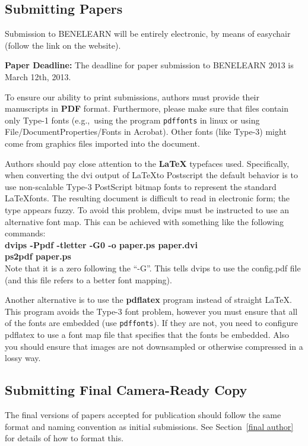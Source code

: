 \documentclass{article}
\begin{document}
\subsection{Submitting Papers}

Submission to BENELEARN will be entirely electronic, by means of easychair (follow the link on the website).  

{\bf Paper Deadline:} The deadline for paper submission to BENELEARN 2013 is March 12th, 2013.

To ensure our ability to print submissions, authors must provide their manuscripts in \textbf{PDF} format. Furthermore, please make sure that files contain only Type-1 fonts (e.g.,~using the program {\tt pdffonts} in linux or using File/DocumentProperties/Fonts in Acrobat).  Other fonts (like Type-3) might come from graphics files imported into the document.

Authors should pay close attention to the \textbf{\LaTeX} typefaces used.  Specifically, when converting the dvi output of \LaTeX to Postscript the default behavior is to use non-scalable Type-3 PostScript bitmap fonts to represent the standard \LaTeX fonts. The resulting document is difficult to read in electronic form; the type appears fuzzy. To avoid this problem, dvips must be instructed to use an alternative font map.  This can be achieved with something like the following commands:\\ {\bf dvips -Ppdf -tletter -G0 -o paper.ps paper.dvi}\\ {\bf ps2pdf paper.ps}\\ Note that it is a zero following the ``-G''. This tells dvips to use the config.pdf file (and this file refers to a better font mapping).

Another alternative is to use the \textbf{pdflatex} program instead of straight \LaTeX. This program avoids the Type-3 font problem, however you must ensure that all of the fonts are embedded (use {\tt pdffonts}). If they are not, you need to configure pdflatex to use a font map file that specifies that the fonts be embedded. Also you should ensure that images are not downsampled or otherwise compressed in a lossy way.

\subsection{Submitting Final Camera-Ready Copy}

The final versions of papers accepted for publication should follow the same format and naming convention as initial submissions. See Section~\ref{final author} for details of how to format this.
\end{document}
